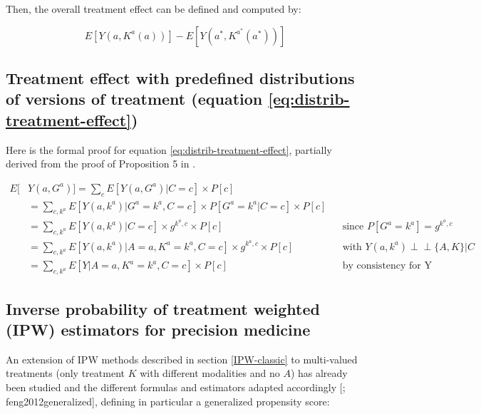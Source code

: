 \documentclass[a4paper,12pt,twoside,onecolumn,openright,final,oldfontcommands]{memoir}
\begin{document}
\endgroup

Then, the overall treatment effect can be defined and computed by:

\[E[Y(a, K^a(a))] - E[Y(a^*, K^{a^*}(a^*))]\]

\subsection{Treatment effect with predefined distributions of versions
of treatment (equation
\eqref{eq:distrib-treatment-effect})}\label{appendix-distrib-treatment-effect}

Here is the formal proof for equation \eqref{eq:distrib-treatment-effect},
partially derived from the proof of Proposition 5 in
\citep{vanderweele2013causal}.

\begingroup
\footnotesize

\begin{equation*}
\begin{aligned}
  E[ & Y(a, G^a)] = \sum_{c} E[Y(a, G^a)|C=c] \times P[c]\\
             & = \sum_{c, k^a} E[Y(a, k^a)|G^a=k^a, C=c] \times P[G^a=k^a|C=c] \times P[c]\\
             & = \sum_{c, k^a} E[Y(a, k^a)| C=c] \times g^{k^a,c} \times P[c]
             &&\text{since } P[G^a=k^a] = g^{k^a,c}\\
             & = \sum_{c, k^a} E[Y(a, k^a)| A=a, K^a=k^a, C=c] \times g^{k^a,c} \times P[c] 
             &&\text{with } Y(a,k^a) \perp \!\!\! \perp \{A,K\} | C\\
             & = \sum_{c, k^a} E[Y| A=a, K^a=k^a, C=c] \times P[c]
             &&\text{by consistency for Y}
\end{aligned}
\end{equation*}

\endgroup

\subsection{Inverse probability of treatment weighted (IPW) estimators
for precision medicine}\label{appendix-IPW}

An extension of IPW methods described in section \ref{IPW-classic} to
multi-valued treatments (only treatment \(K\) with different modalities
and no \(A\)) has already been studied and the different formulas and
estimators adapted accordingly {[}\citet{imbens2000role};
feng2012generalized{]}, defining in particular a generalized propensity
score:
\end{document}
